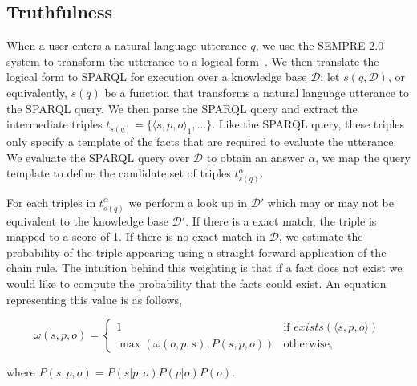 

\subsection{Truthfulness}
\label{sec:probqa-interface}

When a user enters a natural language utterance \(q\), we use the SEMPRE 2.0 system to transform the utterance to a logical form~\cite{berant2013freebase,berant2013semantic}.
We then translate the logical form to SPARQL for execution over a knowledge base \(\mathcal{D}\);
let \(s(q,\mathcal{D})\), or equivalently, \(s(q)\) be a function that transforms a natural language utterance to the SPARQL query.
We then parse the SPARQL query and extract the intermediate triples \( t_{s(q)} = \{\langle s,p,o\rangle_1, \ldots \}\). 
Like the SPARQL query, these triples only specify a template of the facts that are required to evaluate the utterance.
We evaluate the SPARQL query over \(\mathcal{D}\) to obtain an answer \( \alpha \), we map the query template to define the candidate set of triples \( t^\alpha_{s(q)} \).

For each triples in \( t^\alpha_{s(q)} \) we perform a look up in \(\mathcal{D'}\) which may or may not be equivalent to the knowledge base \(\mathcal{D'}\).
If there is a exact match, the triple is mapped to a score of 1.
If there is no exact match in \(\mathcal{D}\), we estimate the probability of the triple appearing using a straight-forward application of the chain rule.
The intuition behind this weighting is that if a fact does not exist we would like to compute the probability that the facts could exist.
An equation representing this value is as follows,

\begin{equation}
  \label{eq:probqa-weight}
  \omega(s,p,o) = \begin{cases}
    1 & \mbox{if } exists(\langle s,p,o \rangle) \\ 
    \max( \omega(o,p,s), P(s,p,o)) & \mbox{otherwise,}
  \end{cases}
\end{equation}

where \( P(s,p,o) = P(s|p,o)  P(p|o)  P(o) \).

